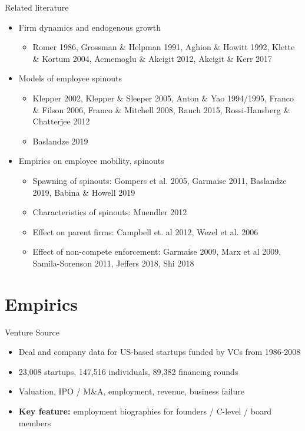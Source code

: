 \documentclass[english,usenames,dvipsnames]{beamer}
\begin{document}
\begin{frame}{Related literature}
\begin{itemize}
\item Firm dynamics and endogenous growth
\begin{itemize}
\item Romer 1986, Grossman \& Helpman 1991, Aghion \& Howitt 1992, Klette \& Kortum 2004, Acmemoglu \& Akcigit 2012, Akcigit \& Kerr 2017
\end{itemize}
\item Models of employee spinouts
\begin{itemize}
\item Klepper 2002, Klepper \& Sleeper 2005, Anton \& Yao 1994/1995, Franco \& Filson 2006, Franco \& Mitchell 2008, Rauch 2015, Rossi-Hansberg \& Chatterjee 2012
\item Baslandze 2019
\end{itemize}
\item Empirics on employee mobility, spinouts
\begin{itemize}
\item Spawning of spinouts: Gompers et al. 2005, Garmaise 2011, Baslandze 2019, Babina \& Howell 2019
\item Characteristics of spinouts: Muendler 2012
\item Effect on parent firms: Campbell et. al 2012, Wezel et al. 2006
\item Effect of non-compete enforcement: Garmaise 2009, Marx et al 2009, Samila-Sorenson 2011, Jeffers 2018, Shi 2018
\end{itemize}
\end{itemize}
\end{frame}



\section{Empirics}

\begin{frame}
\tableofcontents[currentsection]
\end{frame}

\begin{frame}{Venture Source}
\begin{itemize}
	\item Deal and company data for US-based startups funded by VCs from 1986-2008
	\item 23,008 startups, 147,516 individuals, 89,382 financing rounds
	\item Valuation, IPO / M\&A, employment, revenue, business failure
	\item \textbf{\alert{Key feature: }} employment biographies for founders / C-level / board members
\end{itemize}
\end{frame}
\end{document}
